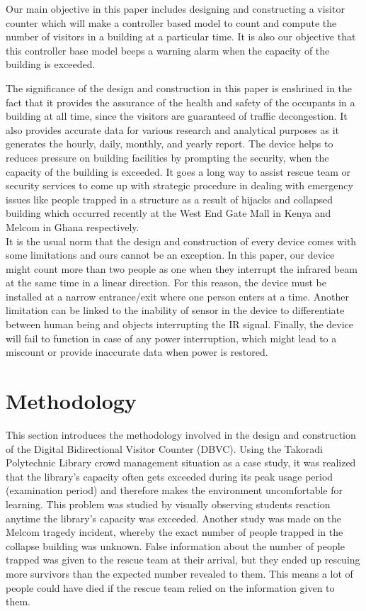 \documentclass{article}
\begin{document}
\par
Our main objective in this paper includes designing and constructing a visitor counter which will make a
controller based model to count and compute the number of visitors in a building at a particular time. It is also
our objective that this controller base model beeps a warning alarm when the capacity of the building is
exceeded.\\

\par
The significance of the design and construction in this paper is enshrined in the fact that it provides the assurance
of the health and safety of the occupants in a building at all time, since the visitors are guaranteed of traffic
decongestion. It also provides accurate data for various research and analytical purposes as it generates the
hourly, daily, monthly, and yearly report. The device helps to reduces pressure on building facilities by
prompting the security, when the capacity of the building is exceeded. It goes a long way to assist rescue team or
security services to come up with strategic procedure in dealing with emergency issues like people trapped in a
structure as a result of hijacks and collapsed building which occurred recently at the West End Gate Mall in
Kenya and Melcom in Ghana respectively.\\
It is the usual norm that the design and construction of every device comes with some limitations and ours
cannot be an exception. In this paper, our device might count more than two people as one when they interrupt
the infrared beam at the same time in a linear direction. For this reason, the device must be installed at a narrow
entrance/exit where one person enters at a time. Another limitation can be linked to the inability of sensor in the
device to differentiate between human being and objects interrupting the IR signal. Finally, the device will fail to
function in case of any power interruption, which might lead to a miscount or provide inaccurate data when
power is restored.

\section{Methodology}
This section introduces the methodology involved in the design and construction of the Digital Bidirectional
Visitor Counter (DBVC). Using the Takoradi Polytechnic Library crowd management situation as a case study,
it was realized that the library’s capacity often gets exceeded during its peak usage period (examination period)
and therefore makes the environment uncomfortable for learning. This problem was studied by visually
observing students reaction anytime the library’s capacity was exceeded. Another study was made on the
Melcom tragedy incident, whereby the exact number of people trapped in the collapse building was unknown.
False information about the number of people trapped was given to the rescue team at their arrival, but they
ended up rescuing more survivors than the expected number revealed to them. This means a lot of people could
have died if the rescue team relied on the information given to them.\\
\end{document}

